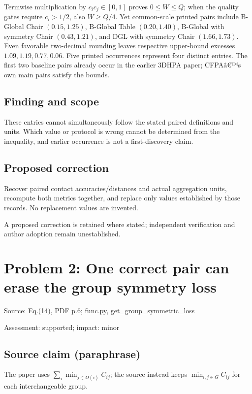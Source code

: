 \documentclass[11pt]{article}
\begin{document}
Termwise multiplication by \(c_ic_j\in[0,1]\) proves \(0\le W\le Q\); when the quality gates require \(c_i>1/2\), also \(W\ge Q/4\). Yet common-scale printed pairs include B-Global Chair \((0.15,1.25)\), B-Global Table \((0.20,1.40)\), B-Global with symmetry Chair \((0.43,1.21)\), and DGL with symmetry Chair \((1.66,1.73)\). Even favorable two-decimal rounding leaves respective upper-bound excesses \(1.09,1.19,0.77,0.06\). Five printed occurrences represent four distinct entries. The first two baseline pairs already occur in the earlier 3DHPA paper; CFPAâ€™s own main pairs satisfy the bounds.

\subsection*{Finding and scope}

These entries cannot simultaneously follow the stated paired definitions and units. Which value or protocol is wrong cannot be determined from the inequality, and earlier occurrence is not a first-discovery claim.

\subsection*{Proposed correction}

Recover paired contact accuracies/distances and actual aggregation units, recompute both metrics together, and replace only values established by those records. No replacement values are invented.

A proposed correction is retained where stated; independent verification and author adoption remain unestablished.

\section*{Problem 2: One correct pair can erase the group symmetry loss}

Source: Eq.(14), PDF p.6; func.py, get\_group\_symmetric\_loss

Assessment: supported; impact: minor

\subsection*{Source claim (paraphrase)}

The paper uses \(\sum_i\min_{j\in\Omega(i)}C_{ij}\); the source instead keeps \(\min_{i,j\in G}C_{ij}\) for each interchangeable group.
\end{document}
